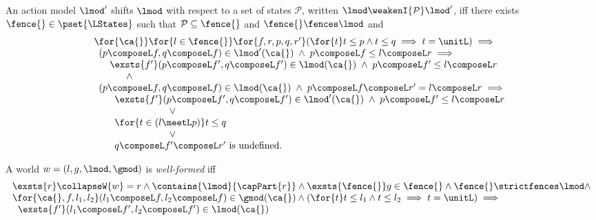 \begin{definition}An action model $\lmod'$  shifts $\lmod$ with respect to a set of states $\mathcal{P}$, written $\lmod \weakenI{\mathcal{P}} \lmod'$, iff there exists $\fence{} \in \pset{\LStates}$ such that $\mathcal{P} \subseteq \fence{}$ and $\fence{} \fences \lmod$ and 
%
\[
\begin{array}{l}
	\hspace*{0.2cm}\for{\ca{}} \for{l \in \fence{}}  \for{f, r, p, q, r'} (\for{t} t \leq p \land t \leq q \implies t = \unitL) \implies\\
	\hspace*{0.2cm}
	\begin{array}{l}
		(p \composeL f, q \composeL f) \in \lmod'(\ca{}) 
		\;\land\; p \composeL f \leq l \composeL r \implies \\
		\hspace*{0.4cm}\exsts{f'} (p \composeL f', q \composeL f') \in \lmod(\ca{}) \;\land\; p \composeL f' \leq l \composeL r \\

		\hspace*{1cm} \land\\
		
		(p \composeL f, q \composeL f) \in \lmod(\ca{})
		\;\land\; p \composeL f \composeL r' = l \composeL r \implies \\
		\hspace*{0.4cm}
		\begin{array}{l}
			\exsts{f'} (p \composeL f', q \composeL f') \in \lmod'(\ca{}) \;\land\; p \composeL f' \leq l \composeL r \\
			\hspace*{2cm} \lor\\
			\for{t \in \left( l \meetL p \right)} t \leq q\\
			\hspace*{2cm} \lor\\
			q \composeL f' \composeL r' \text{ is undefined.}
			
		\end{array}

	\end{array}
	
	
\end{array}
\]
%
\end{definition}
%
%
\begin{definition}\label{def:wellformedness}
A world $w = (l, g, \lmod, \gmod)$ is \emph{well-formed} iff
\[
\begin{array}{l}
	\exsts{r} \collapseW{w} = r  \land \contains{\lmod}{\capPart{r}} \land \exsts{\fence{}} g \in \fence{} \land \fence{} \strictfences \lmod\land\\
	\for{\ca{}, f, l_1, l_2} (l_1 \composeL f, l_2 \composeL f) \in \gmod(\ca{}) \land (\for{t} t \leq l_1 \land t \leq l_2 \implies t = \unitL) \implies\\
	\hspace{0.2cm}  \exsts{f'} (l_1 \composeL f', l_2 \composeL f') \in \lmod(\ca{}) 
\end{array}
\]
%
\end{definition}
